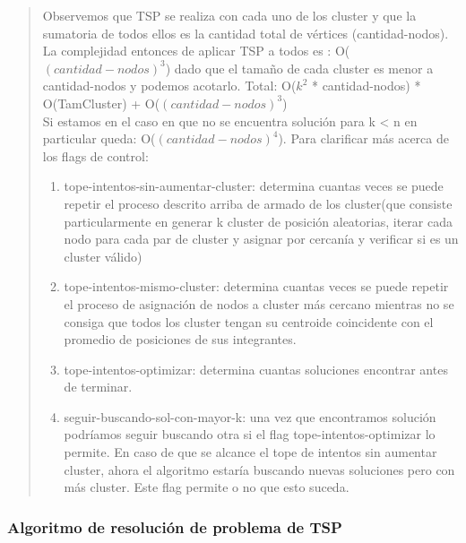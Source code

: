 \documentclass[11pt,a4paper]{article}
\begin{document}
\begin{verse}
Observemos que TSP se realiza con cada uno de los cluster y que la sumatoria de todos ellos es la cantidad total de vértices (cantidad-nodos). La complejidad entonces de aplicar TSP a todos es : O($(cantidad-nodos)^{3}$) dado que el tamaño de cada cluster es menor a cantidad-nodos y podemos acotarlo.
Total: O($k^{2}$ * cantidad-nodos) * O(TamCluster) + O($(cantidad-nodos)^{3}$)\\
Si estamos en el caso en que no se encuentra solución para k < n en particular queda: O($(cantidad-nodos)^{4}$).
Para clarificar más acerca de los flags de control:
\begin{enumerate}
\item tope-intentos-sin-aumentar-cluster: determina cuantas veces se puede repetir el proceso descrito arriba de armado de los cluster(que consiste particularmente en generar k cluster de posición aleatorias, iterar cada nodo para cada par de cluster y asignar por cercanía y verificar si es un cluster válido)
\item tope-intentos-mismo-cluster: determina cuantas veces se puede repetir el proceso de asignación de nodos a cluster más cercano mientras no se consiga que todos los cluster tengan su centroide coincidente con el promedio de posiciones de sus integrantes.

\item tope-intentos-optimizar: determina cuantas soluciones encontrar antes de terminar. 
\item seguir-buscando-sol-con-mayor-k: una vez que encontramos solución podríamos seguir buscando otra si el flag tope-intentos-optimizar lo permite. En caso de que se alcance el tope de intentos sin aumentar cluster, ahora el algoritmo estaría buscando nuevas soluciones pero con más cluster. Este flag permite o no que esto suceda.
\end{enumerate}

\end{verse}


\subsubsection{Algoritmo de resolución de problema de TSP}
\end{document}
